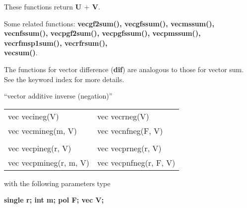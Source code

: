 These functions return {\bf U $+$ V}.

Some related functions:\hspace*{0.7em}
{\bf  vecgf2sum(), vecgfssum(), vecmssum(), vecnfssum(), \newline
        vecpgf2sum(), vecpgfssum(), vecpmssum(), vecrfmsp1sum(), vecrfrsum(), \\
vecsum()}.

The functions for vector difference ({\bf *dif}) are analogous to those for vector sum. See the keyword
index for more details.

% 
% 



\begin{center} ``vector additive inverse (negation)'' \end{center}
\begin{center}
{\bf
\begin{tabular}{ll}
vec vecineg(V)   & vec vecrneg(V)   \\
vec vecmineg(m, V)&  vec vecnfneg(F, V) \\
&\\
vec vecpineg(r, V)   & vec vecprneg(r, V) \\
vec vecpmineg(r, m, V) & vec vecpnfneg(r, F, V) \\
\end{tabular} }
\end{center}
\parbox[t]{2.5in}{with the following parameters type}
\parbox[t]{3.0in}{
\bf single r;\newline
    int m;\newline
    pol F;\newline
    vec V;}

